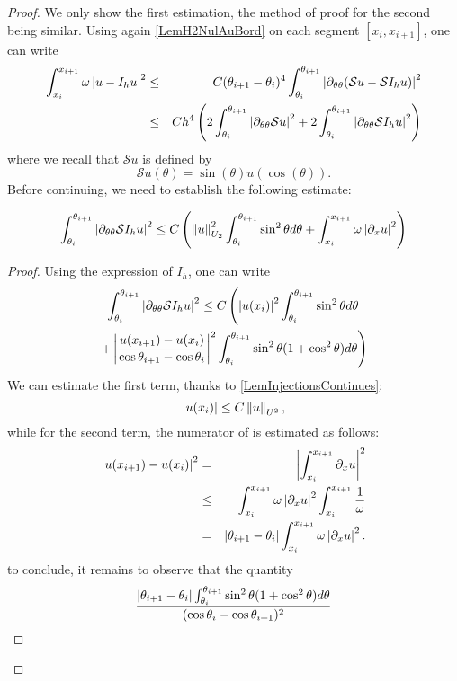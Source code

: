 \documentclass[a4paper]{article}
\begin{document}
\begin{proof}
	We only show the first estimation, the method of proof for the second being similar. Using again \autoref{LemH2NulAuBord} on each segment $[x_i, x_{i+1}]$, one can write
	\begin{eqnarray*}
		\int_{x_i}^{x_{i+1}} \omega \left\lvert u - I_h u \right\rvert^2 &\leq& C  (\theta_{i+1} - \theta_i)^4 \int_{\theta_i}^{\theta_{i+1}} \left\lvert \partial_{\theta\theta}(\mathcal{S}u- \mathcal{S}I_h u) \right\rvert^2 \\
		&\leq& C h^4 \left(2\int_{\theta_i}^{\theta_{i+1}} \left\lvert \partial_{\theta\theta}\mathcal{S}u \right\rvert^2 + 2\int_{\theta_i}^{\theta_{i+1}}\left\lvert \partial_{\theta\theta}\mathcal{S}I_h u \right\rvert^2\right)
	\end{eqnarray*}
	where we recall that $\mathcal{S}u$ is defined by 
	\[\mathcal{S}u(\theta) = \sin(\theta)u(\cos(\theta)).\] 
	Before continuing, we need to establish the following estimate:
\begin{Lem}
	\[\int_{\theta_i}^{\theta_{i+1}} \left\lvert \partial_{\theta\theta}\mathcal{S} I_hu \right\rvert^2 \leq  C \left(\left\|u\right\|^2_{U_2} \int_{\theta_i}^{\theta_{i+1}} \sin^2\theta d\theta +  \int_{x_i}^{x_{i+1}} \omega \left\lvert \partial_x u \right\rvert^2\right)\]
	\label{LemIntermediaire}
\end{Lem}
\begin{proof}
	Using the expression of $I_h$, one can write
	\begin{multline}
	\int_{\theta_i}^{\theta_{i+1}} \left\lvert \partial_{\theta\theta}\mathcal{S} I_hu \right\rvert^2\leq C\left(\left\lvert  u(x_i) \right\rvert^2 \int_{\theta_i}^{\theta_{i+1}} \sin^2\theta d\theta \right.\\
	\left.+ \left\lvert \frac{u(x_{i+1}) -  u(x_{i})}{\cos\theta_{i+1} - \cos\theta_i} \right\rvert^2 \int_{\theta_i}^{\theta_{i+1}} \sin^2\theta(1 + \cos^2\theta)d\theta\right)
	\label{CalculIntermediaire}
	\end{multline}
	We can estimate the first term, thanks to \autoref{LemInjectionsContinues}:
	\[\left\lvert  u(x_i) \right\rvert \leq C \left\|u\right\|_{U^2},\]
	while for the second term, the numerator of is estimated as follows: 
	\begin{eqnarray*}
		\left\lvert u(x_{i+1}) - u(x_i) \right\rvert^2 &=& \left\lvert  \int_{x_i}^{x_{i+1}} \partial_x  u \right\rvert^2 \\
		& \leq & \int_{x_i}^{x_{i+1}} \omega \left\lvert \partial_x u \right\rvert^2 \int_{x_i}^{x_{i+1}} \frac{1}{\omega} \\
		&  = & \left\lvert \theta_{i+1} - \theta_i \right\rvert\int_{x_i}^{x_{i+1}} \omega \left\lvert \partial_x u \right\rvert^2.
	\end{eqnarray*}
	to conclude, it remains to observe that the quantity 
	\[\frac{\left\lvert \theta_{i+1} - \theta_i \right\rvert \int_{\theta_i}^{\theta_{i+1}}{\sin^2\theta(1 + \cos^2\theta)d\theta}}{(\cos\theta_{i} - \cos\theta_{i+1})^2}\]

\end{proof}
\end{proof}
\end{document}
